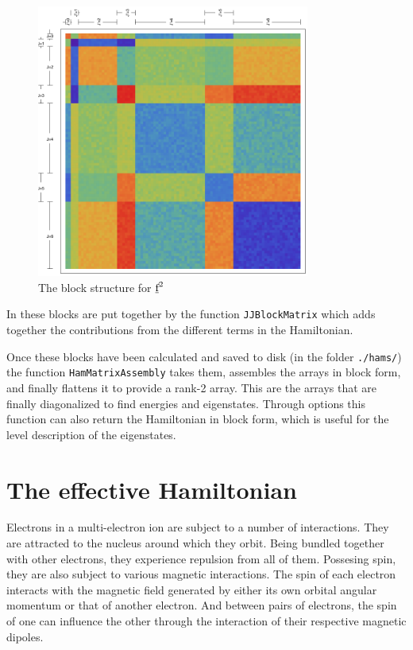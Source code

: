 \documentclass{article}
\newcommand{\codetext}[1]{{\color{BlueViolet} \texttt{#1}}}
\begin{document}
\begin{figure}[h!]
\begin{center}
	\includegraphics[width=0.8\textwidth]{blockStruct.pdf}
\end{center}
\caption{The block structure for $\underbar{$\text{f}$}^2$}
\label{JJ blocks} 
\end{figure}

In \qlanth these blocks are put together by the function \codetext{JJBlockMatrix} which adds together the contributions from the different terms in the Hamiltonian.



Once these blocks have been calculated and saved to disk (in the folder \codetext{./hams/}) the function \codetext{HamMatrixAssembly} takes them, assembles the arrays in block form, and finally flattens it to provide a rank-2 array. This are the arrays that are finally diagonalized to find energies and eigenstates. Through options this function can also return the Hamiltonian in block form, which is useful for the level description of the eigenstates.



\section{The effective Hamiltonian} 

Electrons in a multi-electron ion are subject to a number of interactions. They are attracted to the nucleus around which they orbit. Being bundled together with other electrons, they experience repulsion from all of them. Possesing spin, they are also subject to various magnetic interactions. The spin of each electron interacts with the magnetic field generated by either its own orbital angular momentum or that of another electron. And between pairs of electrons, the spin of one can influence the other through the interaction of their respective magnetic dipoles.
\end{document}

